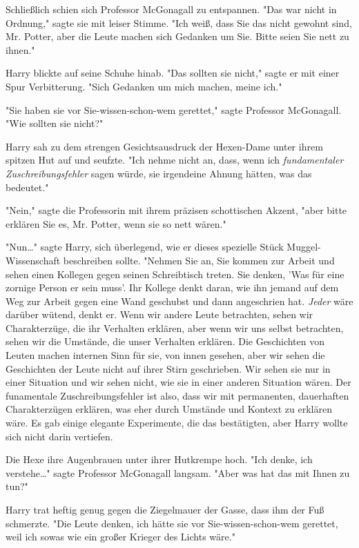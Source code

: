 {Schließlich schien sich Professor McGonagall zu entspannen. "Das war nicht in Ordnung," sagte sie mit leiser Stimme. "Ich weiß, dass Sie das nicht gewohnt sind, Mr. Potter, aber die Leute machen sich Gedanken um Sie. Bitte seien Sie nett zu ihnen."

Harry blickte auf seine Schuhe hinab. "Das sollten sie nicht," sagte er mit einer Spur Verbitterung. "Sich Gedanken um mich machen, meine ich."

"Sie haben sie vor Sie-wissen-schon-wem gerettet," sagte Professor McGonagall. "Wie sollten sie nicht?"

Harry sah zu dem strengen Gesichtsausdruck der Hexen-Dame unter ihrem spitzen Hut auf und seufzte. "Ich nehme nicht an, dass, wenn ich \emph{fundamentaler Zuschreibungsfehler} sagen würde, sie irgendeine Ahnung hätten, was das bedeutet."

"Nein," sagte die Professorin mit ihrem präzisen schottischen Akzent, "aber bitte erklären Sie es, Mr. Potter, wenn sie so nett wären."

"Nun…" sagte Harry, sich überlegend, wie er dieses spezielle Stück Muggel-Wissenschaft beschreiben sollte. "Nehmen Sie an, Sie kommen zur Arbeit und sehen einen Kollegen gegen seinen Schreibtisch treten. Sie denken, 'Was für eine zornige Person er sein muss'. Ihr Kollege denkt daran, wie ihn jemand auf dem Weg zur Arbeit gegen eine Wand geschubst und dann angeschrien hat. \emph{Jeder} wäre darüber wütend, denkt er. Wenn wir andere Leute betrachten, sehen wir Charakterzüge, die ihr Verhalten erklären, aber wenn wir uns selbst betrachten, sehen wir die Umstände, die unser Verhalten erklären. Die Geschichten von Leuten machen internen Sinn für sie, von innen gesehen, aber wir sehen die Geschichten der Leute nicht auf ihrer Stirn geschrieben. Wir sehen sie nur in einer Situation und wir sehen nicht, wie sie in einer anderen Situation wären. Der funamentale Zuschreibungsfehler ist also, dass wir mit permanenten, dauerhaften Charakterzügen erklären, was eher durch Umstände und Kontext zu erklären wäre. Es gab einige elegante Experimente, die das bestätigten, aber Harry wollte sich nicht darin vertiefen.

Die Hexe ihre Augenbrauen unter ihrer Hutkrempe hoch. "Ich denke, ich verstehe…" sagte Professor McGonagall langsam. "Aber was hat das mit Ihnen zu tun?"

Harry trat heftig genug gegen die Ziegelmauer der Gasse, dass ihm der Fuß schmerzte. "Die Leute denken, ich hätte sie vor Sie-wissen-schon-wem gerettet, weil ich sowas wie ein großer Krieger des Lichts wäre."

}
